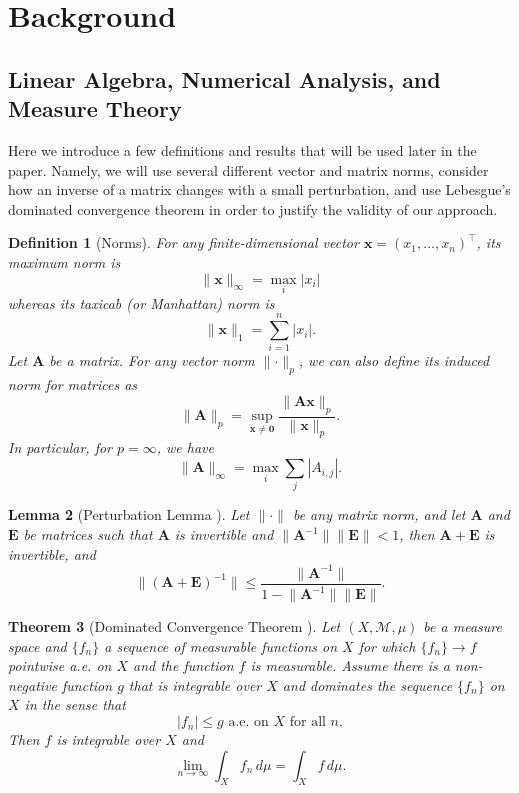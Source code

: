 \documentclass{mpaper}
\newtheorem{theorem}{Theorem}[section]
\newtheorem{lemma}[theorem]{Lemma}
\newtheorem{definition}[theorem]{Definition}
\begin{document}
\section{Background} \label{sec:background}

\subsection{Linear Algebra, Numerical Analysis, and Measure Theory}

Here we introduce a few definitions and results that will be used later in the
paper. Namely, we will use several different vector and matrix norms, consider
how an inverse of a matrix changes with a small perturbation, and use Lebesgue's
dominated convergence theorem in order to justify the validity of our approach.

\begin{definition}[Norms]
  For any finite-dimensional vector $\mathbf{x} = (x_1, \dots, x_n)^\intercal$,
  its \emph{maximum norm} is
  \[
    \lVert \mathbf{x} \rVert_\infty = \max_i |x_i|
  \]
  whereas its \emph{taxicab} (or \emph{Manhattan}) \emph{norm} is
  \[
    \lVert \mathbf{x} \rVert_1 = \sum_{i = 1}^n |x_i|.
  \]
  Let $\mathbf{A}$ be a matrix. For any vector norm $\lVert
  \cdot \rVert_p$, we can also define its \emph{induced norm} for matrices as
  \[
    \lVert \mathbf{A} \rVert_p = \sup_{\mathbf{x} \ne \mathbf{0}} \frac{\lVert
      \mathbf{Ax} \rVert_p}{\lVert \mathbf{x} \rVert_p}.
  \]
  In particular, for $p = \infty$, we have
  \[
    \lVert \mathbf{A} \rVert_\infty = \max_i \sum_{j} |A_{i,j}|.
  \]
\end{definition}

\begin{lemma}[Perturbation Lemma
  \cite{layton2014numerical}] \label{lemma:perturbation}
  Let $\lVert \cdot \rVert$ be any matrix norm, and let $\mathbf{A}$ and
  $\mathbf{E}$ be matrices such that $\mathbf{A}$ is invertible and $\lVert
  \mathbf{A}^{-1} \rVert \lVert \mathbf{E} \rVert < 1$, then $\mathbf{A} +
  \mathbf{E}$ is invertible, and
  \[
    \lVert (\mathbf{A} + \mathbf{E})^{-1} \rVert \le \frac{\lVert
      \mathbf{A}^{-1} \rVert}{1 - \lVert \mathbf{A}^{-1} \rVert \lVert
      \mathbf{E} \rVert}.
  \]
\end{lemma}

\begin{theorem}[Dominated Convergence Theorem
  \cite{royden2010real}] \label{thm:lebesgue}
  Let $(X, \mathcal{M}, \mu)$ be a measure space and $\{ f_n \}$ a sequence of
  measurable functions on $X$ for which $\{ f_n \} \to f$ pointwise a.e. on $X$
  and the function $f$ is measurable. Assume there is a non-negative function
  $g$ that is integrable over $X$ and dominates the sequence $\{ f_n \}$ on $X$
  in the sense that
  \[
    |f_n| \le g \text{ a.e. on $X$ for all $n$.}
  \]
  Then $f$ is integrable over $X$ and
  \[
    \lim_{n \to \infty} \int_X f_n\,d\mu = \int_X f\,d\mu.
  \]
\end{theorem}
\end{document}
